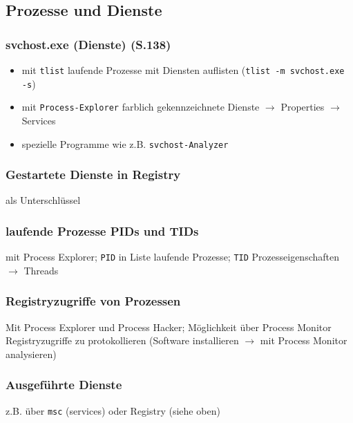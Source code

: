 \begin{multicols}{3}
\subsection{Prozesse und Dienste}
\subsubsection{svchost.exe (Dienste) (S.138)}
\begin{itemize}[leftmargin=*]
	\item mit \texttt{tlist} laufende Prozesse mit Diensten auflisten (\texttt{tlist -m svchost.exe -s})
	\item mit \texttt{Process-Explorer} farblich gekennzeichnete Dienste $\rightarrow$ Properties $\rightarrow$ Services
	\item spezielle Programme wie z.B. \texttt{svchost-Analyzer}
\end{itemize}

\subsubsection{Gestartete Dienste in Registry}
 als Unterschlüssel

\subsubsection{laufende Prozesse PIDs und TIDs}
mit Process Explorer; \texttt{PID} in Liste laufende Prozesse; \texttt{TID} Prozesseigenschaften $\rightarrow$ Threads\\

\subsubsection{Registryzugriffe von Prozessen}
Mit Process Explorer und Process Hacker; Möglichkeit über Process Monitor Registryzugriffe zu protokollieren (Software installieren $\rightarrow$ mit Process Monitor analysieren)\\

\subsubsection{Ausgeführte Dienste}
z.B. über \texttt{msc} (services) oder Registry (siehe oben)


\end{multicols}
